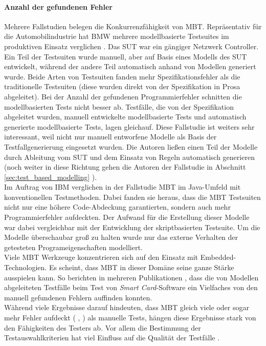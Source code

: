 \paragraph{Anzahl der gefundenen Fehler} Mehrere Fallstudien belegen die Konkurrenzfähigkeit von MBT. Repräsentativ für die Automobilindustrie hat BMW mehrere modellbasierte Testsuites im produktiven Einsatz verglichen \cite{pretschner_one_2005}. Das \Gls{SUT} war ein gängiger Netzwerk Controller. Ein Teil der Testsuiten wurde manuell, aber auf Basis eines Modells des \Gls{SUT} entwickelt, während der andere Teil automatisch anhand von Modellen generiert wurde. Beide Arten von Testsuiten fanden mehr Spezifikationsfehler als die traditionelle Testsuiten (diese wurden direkt von der Spezifikation in Prosa abgeleitet). Bei der Anzahl der gefundenen Programmierfehler schnitten die modellbasierten Tests nicht besser ab. Testfälle, die von der Spezifikation abgeleitet wurden, manuell entwickelte modellbasierte Tests und automatisch generierte modellbasierte Tests, lagen gleichauf. Diese Fallstudie ist weiters sehr interessant, weil nicht nur manuell entworfene Modelle als Basis der Testfallgenerierung eingesetzt wurden. Die Autoren ließen einen Teil der Modelle durch Ableitung vom \Gls{SUT} und dem Einsatz von Regeln automatisch generieren (noch weiter in diese Richtung gehen die Autoren der Fallstudie in Abschnitt \ref{sec:test_based_modelling} ).\\
Im Auftrag von IBM verglichen \citeauthor{farchi_using_2002} in der Fallstudie \cite{farchi_using_2002} \Gls{MBT} im Java-Umfeld mit konventionellen Testmethoden. Dabei fanden sie heraus, dass die \Gls{MBT} Testsuiten nicht nur eine höhere Code-Abdeckung garantierten, sondern auch mehr Programmierfehler aufdeckten. Der Aufwand für die Erstellung dieser Modelle war dabei vergleichbar mit der Entwicklung der skriptbasierten Testsuite. Um die Modelle überschaubar groß zu halten wurde nur das externe Verhalten der getesteten Programeigenschaften modelliert.\\
Viele \Gls{MBT} Werkzeuge konzentrieren sich auf den Einsatz mit Embedded-Technologien. Es scheint, dass \Gls{MBT} in dieser Domäne seine ganze Stärke ausspielen kann. So berichten \citeauthor{legeard_generation_2001} in mehreren Publikationen \cite{legeard_generation_2001}, dass die von Modellen abgeleiteten Testfälle beim Test von \textit{Smart Card}-Software ein Vielfaches von den manuell gefundenen Fehlern auffinden konnten.\\
Während viele Ergebnisse darauf hindeuten, dass \Gls{MBT} gleich viele oder sogar mehr Fehler aufdeckt ( \cite{dalal_model-based_1999}, \cite{legeard_generation_2001}) als manuelle Tests, hängen diese Ergebnisse stark von den Fähigkeiten des Testers ab. Vor allem die Bestimmung der Testauswahlkriterien hat viel Einfluss auf die Qualität der Testfälle \cite{utting_practical_2007}.

